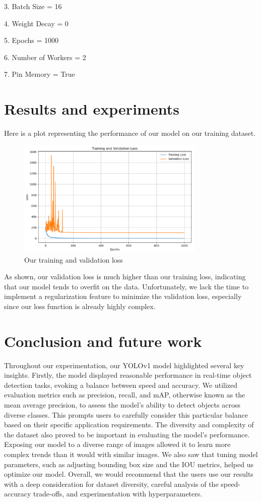 \documentclass{article}
\begin{document}
3. Batch Size = 16 			

4. Weight Decay = 0 		

5. Epochs = 1000		

6. Number of Workers = 2 		

7. Pin Memory = True

\section{Results and experiments}
Here is a plot representing the performance of our model on our training dataset. 

\begin{figure}[H]
  \centering
  \includegraphics[width=0.8\textwidth]{Images/train_val.png}
  \caption{Our training and validation loss}
  \label{fig:example}
\end{figure}

As shown, our validation loss is much higher than our training loss, indicating that our model tends to overfit on the data. Unfortunately, we lack the time to implement a regularization feature to minimize the validation loss, especially since our loss function is already highly complex.


\section{Conclusion and future work}
Throughout our experimentation, our YOLOv1 model highlighted several key insights. Firstly, the model displayed reasonable performance in real-time object detection tasks, evoking a balance between speed and accuracy. We utilized evaluation metrics such as precision, recall, and mAP, otherwise known as the mean average precision, to assess the model's ability to detect objects across diverse classes. This prompts users to carefully consider this particular balance based on their specific application requirements. The diversity and complexity of the dataset also proved to be important in evaluating the model's performance. Exposing our model to a diverse range of images allowed it to learn more complex trends than it would with similar images. We also saw that tuning model parameters, such as adjusting bounding box size and the IOU metrics, helped us optimize our model. Overall, we would recommend that the users use our results with a deep consideration for dataset diversity, careful analysis of the speed-accuracy trade-offs, and experimentation with hyperparameters. \\
\end{document}
